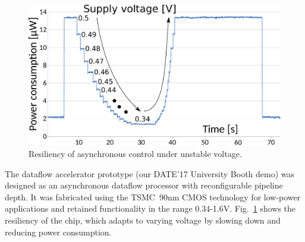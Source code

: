 \documentclass[conference]{IEEEtran}
\begin{document}
\begin{figure}[h!]
\begin{center}
  \includegraphics[width=0.84\linewidth]{FIG/ope-chip.pdf}
  \vspace{-3mm}
  \caption{Resiliency of asynchronous control under unstable voltage.}
  \label{fig:voltage-resiliency}
\end{center}
\vspace{-7mm}
\end{figure}

The dataflow accelerator prototype (our DATE'17 University Booth demo) was
designed as an asynchronous dataflow processor with reconfigurable pipeline depth.
It was fabricated using the TSMC~90nm CMOS technology for low-power applications
and retained functionality in the range 0.34-1.6V.
Fig.~\ref{fig:voltage-resiliency} shows the resiliency of the chip, which adapts
to varying voltage by slowing down and reducing power consumption.
\end{document}

